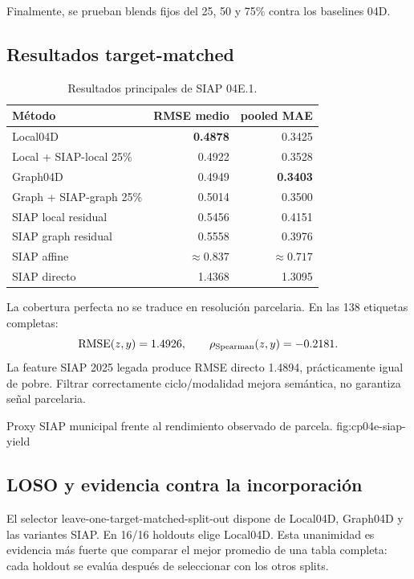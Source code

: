 Finalmente, se prueban blends fijos del 25, 50 y 75\% contra los baselines 04D.

\subsection{Resultados target-matched}

\begin{table}[H]
\centering
\caption{Resultados principales de SIAP 04E.1.}
\label{tab:cp04e-results}
\small
\begin{tabular}{lrr}
\toprule
Método & RMSE medio & pooled MAE \\
\midrule
Local04D & \textbf{0.4878} & 0.3425 \\
Local + SIAP-local 25\% & 0.4922 & 0.3528 \\
Graph04D & 0.4949 & \textbf{0.3403} \\
Graph + SIAP-graph 25\% & 0.5014 & 0.3500 \\
SIAP local residual & 0.5456 & 0.4151 \\
SIAP graph residual & 0.5558 & 0.3976 \\
SIAP affine & $\approx0.837$ & $\approx0.717$ \\
SIAP directo & 1.4368 & 1.3095 \\
\bottomrule
\end{tabular}
\end{table}

La cobertura perfecta no se traduce en resolución parcelaria. En las 138 etiquetas completas:
\[
\operatorname{RMSE}(z,y)=1.4926,
\qquad
\rho_{\mathrm{Spearman}}(z,y)=-0.2181.
\]
La feature SIAP 2025 legada produce RMSE directo 1.4894, prácticamente igual de pobre. Filtrar
correctamente ciclo/modalidad mejora semántica, no garantiza señal parcelaria.

{Proxy SIAP municipal frente al rendimiento observado de parcela.}
{fig:cp04e-siap-yield}

\subsection{LOSO y evidencia contra la incorporación}

El selector leave-one-target-matched-split-out dispone de Local04D, Graph04D y las variantes
SIAP. En 16/16 holdouts elige Local04D. Esta unanimidad es evidencia más fuerte que comparar
el mejor promedio de una tabla completa: cada holdout se evalúa después de seleccionar con los
otros splits.

